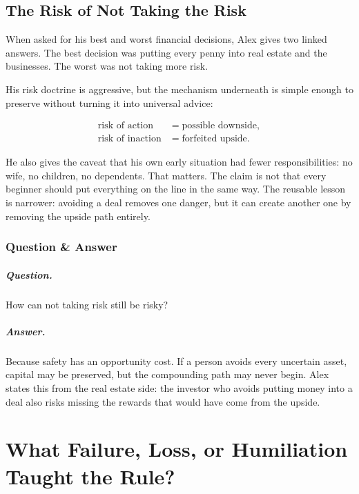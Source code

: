 \documentclass[11pt,oneside]{book}
\begin{document}
\section{The Risk of Not Taking the Risk}

When asked for his best and worst financial decisions, Alex gives two linked answers. The best decision was putting every penny into real estate and the businesses. The worst was not taking more risk.

His risk doctrine is aggressive, but the mechanism underneath is simple enough to preserve without turning it into universal advice:

\begin{align}
\text{risk of action} &= \text{possible downside},\\
\text{risk of inaction} &= \text{forfeited upside}.
\end{align}

He also gives the caveat that his own early situation had fewer responsibilities: no wife, no children, no dependents. That matters. The claim is not that every beginner should put everything on the line in the same way. The reusable lesson is narrower: avoiding a deal removes one danger, but it can create another one by removing the upside path entirely.

\subsection{Question \& Answer}

\paragraph{Question.}
How can not taking risk still be risky?

\paragraph{Answer.}
Because safety has an opportunity cost. If a person avoids every uncertain asset, capital may be preserved, but the compounding path may never begin. Alex states this from the real estate side: the investor who avoids putting money into a deal also risks missing the rewards that would have come from the upside.

\chapter{What Failure, Loss, or Humiliation Taught the Rule?}
\end{document}
